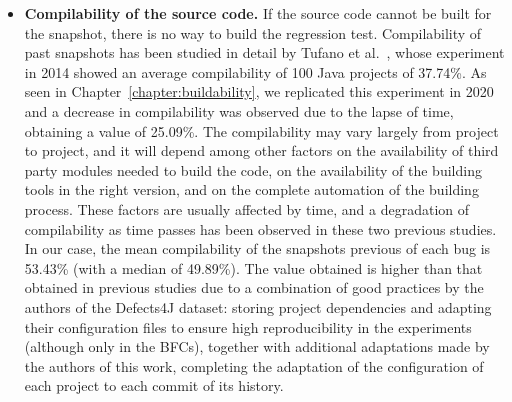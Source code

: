 \begin{itemize}
\item \textbf{Compilability of the source code.} If the source code cannot be built for the snapshot, there is no way to build the regression test. 
Compilability of past snapshots has been studied in detail by Tufano et al.~\cite{tufano2017there}, whose experiment in 2014 showed an average compilability of 100 Java projects of 37.74\%. 
As seen in Chapter~\ref{chapter:buildability}, we replicated this experiment in 2020 and a decrease in compilability was observed due to the lapse of time, 
obtaining a value of 25.09\%. The compilability may vary largely from project to project, and it will depend among other factors on the availability of third party modules needed to build the code, on the availability of the building tools in the right version, and on the complete automation of the building process. These factors are usually affected by time, and a degradation of compilability as time passes has been observed in these two previous studies.
In our case, the mean compilability of the snapshots previous of each bug is 53.43\% (with a median of 49.89\%). 
The value obtained is higher than that obtained in previous studies due to a combination of good practices by the authors of the Defects4J dataset:
storing project dependencies and adapting their configuration files to ensure high reproducibility in the experiments (although only in the BFCs), together with additional adaptations made by the authors of this work, completing the adaptation of the configuration of each project to each commit of its history.

\end{itemize}

